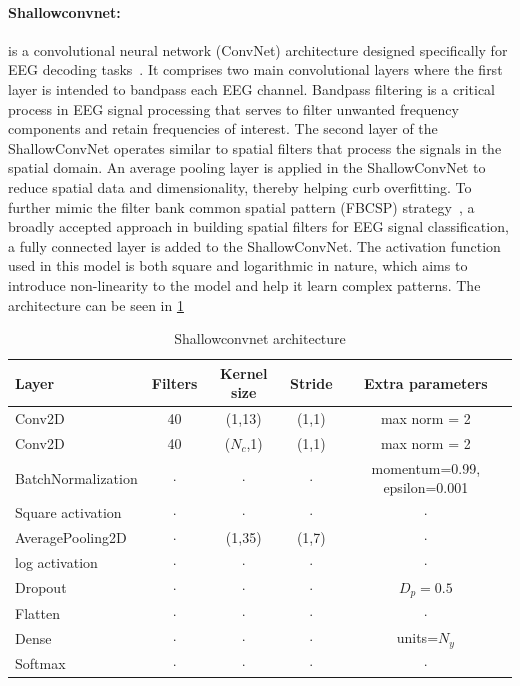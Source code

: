 \paragraph{Shallowconvnet:} is a convolutional neural network (ConvNet) architecture designed specifically for EEG decoding tasks~\cite{schirrmeister2017deep}. It comprises two main convolutional layers where the first layer is intended to bandpass each EEG channel. Bandpass filtering is a critical process in EEG signal processing that serves to filter unwanted frequency components and retain frequencies of interest. The second layer of the ShallowConvNet operates similar to spatial filters that process the signals in the spatial domain. An average pooling layer is applied in the ShallowConvNet to reduce spatial data and dimensionality, thereby helping curb overfitting. To further mimic the filter bank common spatial pattern (FBCSP) strategy~\cite{ang2008filter}, a broadly accepted approach in building spatial filters for EEG signal classification, a fully connected layer is added to the ShallowConvNet. The activation function used in this model is both square and logarithmic in nature, which aims to introduce non-linearity to the model and help it learn complex patterns. The architecture can be seen in \cref{table:shallownet}

\begin{table}[h!]
\caption{Shallowconvnet architecture}\label{table:shallownet}
\centering
\begin{tabular}{l|c|c|c|c}
\hline
\textbf{Layer} & \textbf{Filters} & \textbf{Kernel size} & \textbf{Stride} & \textbf{Extra parameters}\\
\hline
Conv2D & 40 & (1,13) & (1,1)&max norm = 2 \\
Conv2D & 40 & ($N_c$,1) & (1,1)&max norm = 2 \\
BatchNormalization & $\cdot$ & $\cdot$ & $\cdot$ & momentum=0.99, epsilon=0.001\\ 
Square activation & $\cdot$ & $\cdot$ & $\cdot$ & $\cdot$\\
AveragePooling2D & $\cdot$ &(1,35) & (1,7)& $\cdot$\\
log activation & $\cdot$ & $\cdot$ & $\cdot$ & $\cdot$\\
Dropout & $\cdot$ & $\cdot$ & $\cdot$ & $D_p = 0.5$\\
\hline
Flatten & $\cdot$ & $\cdot$ & $\cdot$ & $\cdot$\\
Dense & $\cdot$ & $\cdot$ & $\cdot$ & units=$N_y$\\
Softmax & $\cdot$ & $\cdot$ & $\cdot$ & $\cdot$\\
\hline
\end{tabular}
\end{table}

